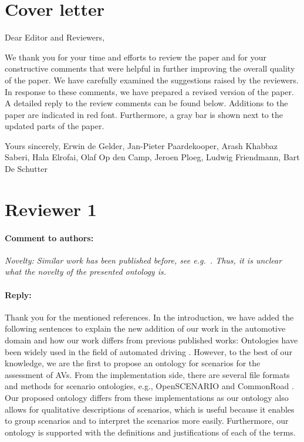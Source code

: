 \documentclass[10pt,final,a4paper,oneside,onecolumn]{article}
\newcommand{\toauthor}{\paragraph*{Comment to authors:} \itshape}
\newcommand{\fromauthor}{\paragraph*{Reply:} \normalfont}
\newcommand{\cstart}{\cbstart\color{red}}
\newcommand{\cend}{\cbend\color{black}}
\begin{document}
	
\section*{Cover letter}

Dear Editor and Reviewers,

We thank you for your time and efforts to review the paper and for your constructive comments that were helpful in further improving the overall quality of the paper. We have carefully examined the suggestions raised by the reviewers. In response to these comments, we have prepared a revised version of the paper. A detailed reply to the review comments can be found below.  Additions to the paper are indicated in \cstart red \cend font. Furthermore, a gray bar is shown next to the updated parts of the paper.

Yours sincerely,
Erwin de Gelder, Jan-Pieter Paardekooper, Arash Khabbaz Saberi, Hala Elrofai, Olaf Op den Camp, Jeroen Ploeg, Ludwig Friendmann, Bart De Schutter


	
\section*{Reviewer 1}

\toauthor Novelty: Similar work has been published before, see e.g.\ \autocite{provine2004ontology, morignot2013ontology, schlenoff2003using, zhao2015core}. Thus, it is unclear what the novelty of the presented ontology is.

\fromauthor Thank you for the mentioned references. In the introduction, we have added the following sentences to explain the new addition of our work in the automotive domain and how our work differs from previous published works: 
\cstart Ontologies have been widely used in the field of automated driving \autocite{provine2004ontology, morignot2013ontology, schlenoff2003using, zhao2015core, maiti2017conceptualization, benvenuti2017ontologybased, bagschik2017ontology}. However, to the best of our knowledge, we are the first to propose an ontology for scenarios for the assessment of AVs. 
From the implementation side, there are several file formats and methods for scenario ontologies, e.g., OpenSCENARIO \autocite{openscenario} and CommonRoad \autocite{althoff2017CommonRoad}. Our proposed ontology differs from these implementations as our ontology also allows for qualitative descriptions of scenarios, which is useful because it enables to group scenarios and to interpret the scenarios more easily.
Furthermore, our ontology is supported with the definitions and justifications of each of the terms.\cend
\end{document}
